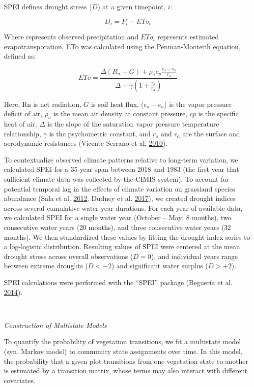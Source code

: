 \documentclass[twoside,12pt,final]{ucthesis-CA2012}
\begin{document}
\begin{ucmainmatter}
SPEI defines drought stress (\(D\)) at a given timepoint, \(i\):

\[
D_i = P_i - ETo_i
\]

Where represents observed precipitation and \(ETo_i\) represents estimated evapotransporation. ETo was calculated using the Penman-Monteith equation, defined as:

\[
ETo = \frac{\Delta(R_n - G) + \rho_a c_p \frac{e_s - e_a}{r_a}}{\Delta + \gamma(1 + \frac{r_s}{r_a})}
\]

Here, Rn is net radiation, \(G\) is soil heat flux, (\(e_s - e_a\)) is the vapor pressure deficit of air, \(\rho_a\) is the mean air density at constant pressure, \(cp\) is the specific heat of air, \(\Delta\) is the slope of the saturation vapor pressure temperature relationship, \(\gamma\) is the psychometric constant, and \(r_s\) and \(r_a\) are the surface and aerodynamic resistances (Vicente-Serrano et al. \protect\hyperlink{ref-Vicente-Serrano2010}{2010}).

To contextualize observed climate patterns relative to long-term variation, we calculated SPEI for a 35-year span between 2018 and 1983 (the first year that sufficient climate data was collected by the CIMIS system).
To account for potential temporal lag in the effects of climate variation on grassland species abundance (Sala et al. \protect\hyperlink{ref-Sala2012b}{2012}, Dudney et al. \protect\hyperlink{ref-Dudney2017}{2017}), we created drought indices across several cumulative water year durations.
For each year of available data, we calculated SPEI for a single water year (October -- May; 8 months), two consecutive water years (20 months), and three consecutive water years (32 months).
We then standardized these values by fitting the drought index series to a log-logistic distribution.
Resulting values of SPEI were centered at the mean drought stress across overall observations (\(D = 0\)), and individual years range between extreme droughts (\(D < -2\)) and significant water surplus (\(D > +2\)).

SPEI calculations were performed with the ``SPEI'' package (Beguería et al. \protect\hyperlink{ref-Begueria2014}{2014}).

~

\emph{Construction of Multistate Models}

To quantify the probability of vegetation transitions, we fit a multistate model (syn. Markov model) to community state assignments over time.
In this model, the probability that a given plot transitions from one vegetation state to another is estimated by a transition matrix, whose terms may also interact with different covariates.


\end{ucmainmatter}
\end{document}
